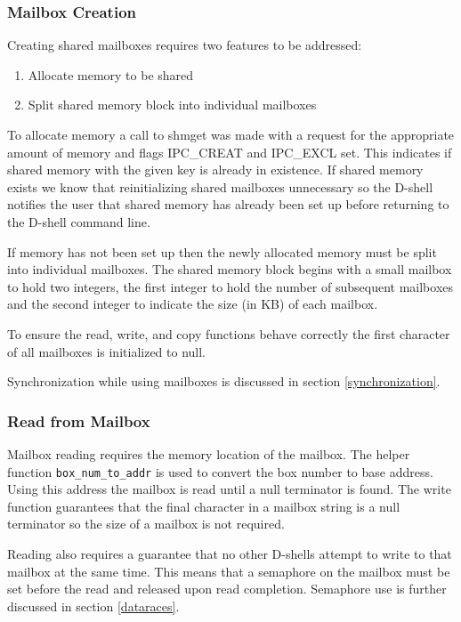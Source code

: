 \begin{multicols}{2}
\subsubsection{Mailbox Creation}
Creating shared mailboxes requires two features to be addressed:
\begin{enumerate}
\item Allocate memory to be shared
\item Split shared memory block into individual mailboxes
\end{enumerate}

To allocate memory a call to shmget was made with a request for the appropriate amount of memory and flags IPC\_CREAT and IPC\_EXCL set. This indicates if shared memory with the given key is already in existence. If shared memory exists we know that reinitializing shared mailboxes unnecessary so the D-shell notifies the user that shared memory has already been set up before returning to the D-shell command line.

If memory has not been set up then the newly allocated memory must be split into individual mailboxes. The shared memory block begins with a small mailbox to hold two integers, the first integer to hold the number of subsequent mailboxes and the second integer to indicate the size (in KB) of each mailbox. 

To ensure the read, write, and copy functions behave correctly the first character of all mailboxes is initialized to null.

Synchronization while using mailboxes is discussed in section \ref{synchronization}.

\subsubsection{Read from Mailbox}
Mailbox reading requires the memory location of the mailbox. The helper function \texttt{box\_num\_to\_addr} is used to convert the box number to base address. Using this address the mailbox is read until a null terminator is found. The write function guarantees that the final character in a mailbox string is a null terminator so the size of a mailbox is not required.

Reading also requires a guarantee that no other D-shells attempt to write to that mailbox at the same time. This means that a semaphore on the mailbox must be set before the read and released upon read completion. Semaphore use is further discussed in section \ref{dataraces}.


\end{multicols}
